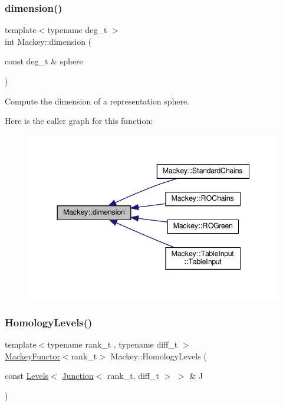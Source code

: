 \subsubsection{\texorpdfstring{dimension()}{dimension()}}
{\footnotesize\ttfamily template$<$typename deg\+\_\+t $>$ \\
int Mackey\+::dimension (\begin{DoxyParamCaption}\item[{const deg\+\_\+t \&}]{sphere }\end{DoxyParamCaption})\hspace{0.3cm}{\ttfamily [inline]}}



Compute the dimension of a representation sphere. 

Here is the caller graph for this function\+:\nopagebreak
\begin{figure}[H]
\begin{center}
\leavevmode
\includegraphics[width=344pt]{namespaceMackey_a6a5d40e69e5628ea84896ee43f4a91fa_icgraph}
\end{center}
\end{figure}
\mbox{\label{namespaceMackey_a1c195484cc947abef84c726b534af5a5}} 
\subsubsection{\texorpdfstring{Homology\+Levels()}{HomologyLevels()}}
{\footnotesize\ttfamily template$<$typename rank\+\_\+t , typename diff\+\_\+t $>$ \\
\hyperlink{classMackey_1_1MackeyFunctor}{Mackey\+Functor}$<$rank\+\_\+t$>$ Mackey\+::\+Homology\+Levels (\begin{DoxyParamCaption}\item[{const \hyperlink{classMackey_1_1Levels}{Levels}$<$ \hyperlink{classMackey_1_1Junction}{Junction}$<$ rank\+\_\+t, diff\+\_\+t $>$ $>$ \&}]{J }\end{DoxyParamCaption})}



